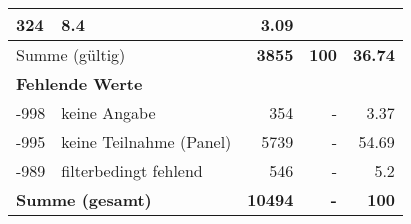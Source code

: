 \begin{longtable}{lXrrr}
       \num{324} &
       \num[round-mode=places,round-precision=2]{8,4} &
         \num[round-mode=places,round-precision=2]{3,09} \\
     \midrule
     \multicolumn{2}{l}{Summe (gültig)} &
       \textbf{\num{3855}} &
     \textbf{100} &
       \textbf{\num[round-mode=places,round-precision=2]{36,74}} \\
     \multicolumn{5}{l}{\textbf{Fehlende Werte}}\\
       -998 &
       keine Angabe &
         \num{354} &
        - &
         \num[round-mode=places,round-precision=2]{3,37} \\
       -995 &
       keine Teilnahme (Panel) &
         \num{5739} &
        - &
         \num[round-mode=places,round-precision=2]{54,69} \\
       -989 &
       filterbedingt fehlend &
         \num{546} &
        - &
         \num[round-mode=places,round-precision=2]{5,2} \\
     \midrule
     \multicolumn{2}{l}{\textbf{Summe (gesamt)}} &
          \textbf{\num{10494}} &
        \textbf{-} &
        \textbf{100} \\
     \bottomrule
     \end{longtable}
     
